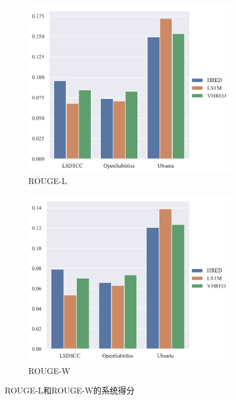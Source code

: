 \begin{figure}[H]
    \begin{subfigure}{0.5\linewidth}
        \centering
        \includegraphics[width=\linewidth]{figure/barplot/rouge_l/plot.pdf}
        \caption{ROUGE-L}
    \end{subfigure}%
    \begin{subfigure}{0.5\linewidth}
        \centering
        \includegraphics[width=\linewidth]{figure/barplot/rouge_w/plot.pdf}
        \caption{ROUGE-W}
    \end{subfigure}
    \centering
    \caption{ROUGE-L和ROUGE-W的系统得分}
    \label{fig:ROUGE_LW_system}
\end{figure}
